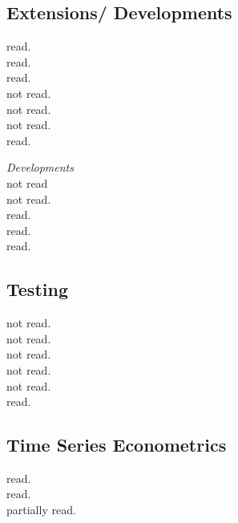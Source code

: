 \subsection{Extensions/ Developments}
\cite{abadie:2019} read.\\
\cite{amjad:2018} read.\\
\cite{benmichael:2021a} read.\\
\cite{benmichael:2021b} not read. \\
\cite{kellog:2021} not read. \\
\cite{kuosmanen:2021} not read.\\
\cite{muhlbach:2019} read.

\textit{Developments}\\
\cite{arkhangelsky:2021} not read\\
\cite{athey:2017} not read.\\
\cite{brodersen:2015} read. \\
\cite{brzeski:2015} read. \\
\cite{hartford:2017} read.

\subsection{Testing}
\cite{andrews:2003} not read. \\
\cite{cattaneo:2021} not read. \\
\cite{chernozhukov:2019} not read.\\
\cite{chernozhukov:2021} not read. \\
\cite{firpo:2018} not read. \\
\cite{hahn:2017} read.

\subsection{Time Series Econometrics}
\cite{martin:2012} read.\\
\cite{harvey:2020} read.\\
\cite{breitung:2021} partially read.

